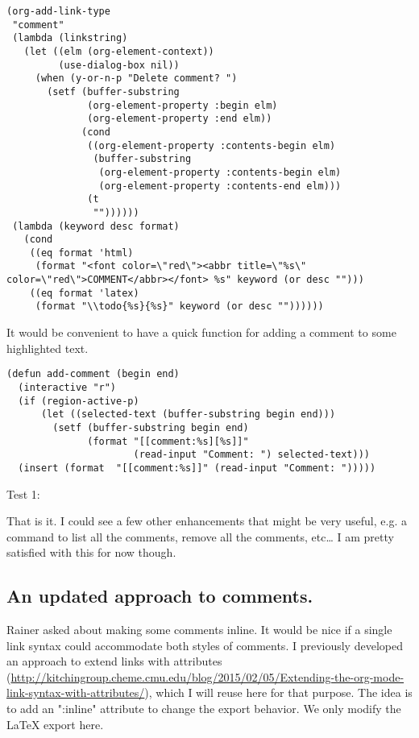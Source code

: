 \documentclass[11pt]{article}
\begin{document}
\begin{verbatim}
(org-add-link-type
 "comment"
 (lambda (linkstring)
   (let ((elm (org-element-context))
         (use-dialog-box nil))
     (when (y-or-n-p "Delete comment? ")
       (setf (buffer-substring
              (org-element-property :begin elm)
              (org-element-property :end elm))
             (cond
              ((org-element-property :contents-begin elm)
               (buffer-substring
                (org-element-property :contents-begin elm)
                (org-element-property :contents-end elm)))
              (t
               ""))))))
 (lambda (keyword desc format)
   (cond
    ((eq format 'html)
     (format "<font color=\"red\"><abbr title=\"%s\" color=\"red\">COMMENT</abbr></font> %s" keyword (or desc "")))
    ((eq format 'latex)
     (format "\\todo{%s}{%s}" keyword (or desc ""))))))
\end{verbatim}


It would be convenient to have a quick function for adding a comment to some highlighted text.

\begin{verbatim}
(defun add-comment (begin end)
  (interactive "r")
  (if (region-active-p)
      (let ((selected-text (buffer-substring begin end)))
        (setf (buffer-substring begin end)
              (format "[[comment:%s][%s]]"
                      (read-input "Comment: ") selected-text)))
  (insert (format  "[[comment:%s]]" (read-input "Comment: ")))))
\end{verbatim}

Test 1: 


That is it. I could see a few other enhancements that might be very useful, e.g. a command to list all the comments, remove all the comments, etc\ldots{} I am pretty satisfied with this for now though.

\subsection{An updated approach to comments.}
\label{sec-1-1}
Rainer asked about making some comments inline. It would be nice if a single link syntax could accommodate both styles of comments. I previously developed an approach to extend links with attributes (\url{http://kitchingroup.cheme.cmu.edu/blog/2015/02/05/Extending-the-org-mode-link-syntax-with-attributes/}), which I will reuse here for that purpose. The idea is to add an ":inline" attribute to change the export behavior. We only modify the \LaTeX{} export here.
\end{document}
